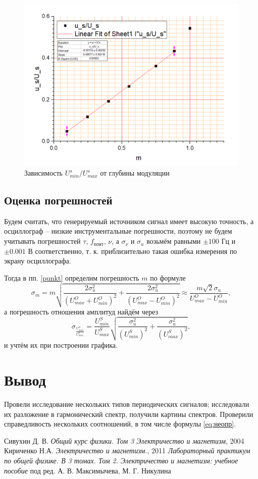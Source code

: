 \documentclass[a4paper]{article}
\begin{document}
\begin{figure}
	\centering
	\includegraphics[width=0.8\linewidth]{"бок осн"}
	\caption{Зависимость $U_{min}^s/U_{max}^s$ от глубины модуляции}
	\label{fig:-}
\end{figure}

\subsection{Оценка погрешностей}

Будем считать, что генерируемый источником сигнал имеет высокую точность, а осциллограф -- низкие инструментальные погрешности, поэтому не будем учитывать погрешностей $ \tau $, $ f_{повт} $, $ \nu $, а $ \sigma_\nu $ и $ \sigma_u $ возьмём равными $ \pm 100 $ Гц и $ \pm 0.001 $ В соответственно, т. к. приблизительно такая ошибка измерения по экрану осциллографа. 

Тогда в пп. \ref{punkt} определим погрешность $ m $ по формуле
\begin{equation}\label{key}
	\sigma_m = m \sqrt{\frac{2 \sigma_u^2}{(U_{max}^O+U_{min}^O)^2}+\frac{2 \sigma_u^2}{(U_{max}^O-U_{min}^O)^2}}\approx \frac{m \sqrt{2} \sigma_u}{U_{max}^O-U_{min}^O}, 	
\end{equation}
а погрешность отношения амплитуд найдём через
\begin{equation}\label{key}
	\sigma_{\frac{U^S_{min}}{U^S_{max}}} = \frac{U^S_{min}}{U^S_{max}} \sqrt{\frac{\sigma_u^2}{(U_{min}^S)^2}+\frac{\sigma_u^2}{(U_{max}^S)^2}},
\end{equation}
и учтём их при построении графика.
\section{Вывод}
Провели исследование нескольких типов периодических сигналов; исследовали их разложение в гармонический спектр, получили картины спектров. Проверили справедливость нескольких соотношений, в том числе формулы \eqref{eq:неопр}.
\newpage
\begin{thebibliography}{9}
 Сивухин Д. В. \emph{Общий курс физики. Том 3 Электричество и магнетизм}, 2004
 Кириченко Н.А. \emph{Электричество и магнетизм.}, 2011
 \emph{Лабораторный практикум по общей физике. В 3 томах. Том 2. Электричество и магнетизм: учебное пособие} под ред. А. В. Максимычева, М. Г. Никулина
\end{thebibliography}
\end{document}
